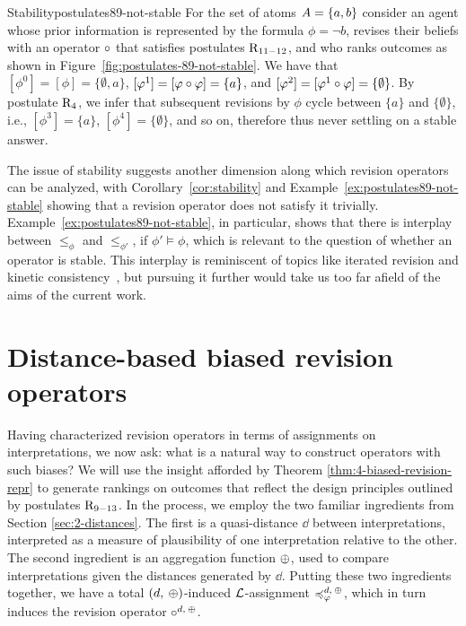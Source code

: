 \begin{xmpl}{Stability}{postulates89-not-stable}
	For the set of atoms $A=\{a,b\}$
	consider an agent whose prior information is represented by the formula
	$\phi=\lnot b$,
	revises their beliefs with an operator $\circ$ that satisfies postulates $\mathrm{R}_{11-12}$,
	and who ranks outcomes as shown in Figure~\ref{fig:postulates-89-not-stable}.
	We have that $[\phi^0]=[\phi]=\{\emptyset,a\}$,
	$[\varphi^1]=[\varphi\circ\varphi]=\{a\}$,
	and $[\varphi^2]=[\varphi^1\circ\varphi]=\{\emptyset\}$.
	By postulate $\mathrm{R}_{4}$, we infer that subsequent revisions by $\phi$
	cycle between $\{a\}$ and $\{\emptyset\}$,
	i.e., 
	$[\phi^3]=\{a\}$,
	$[\phi^4]=\{\emptyset\}$,
	and so on, 
	therefore 
	thus never settling on a stable answer.
\end{xmpl}

The issue of stability suggests another dimension along which
revision operators can be analyzed, with Corollary~\ref{cor:stability}
and Example~\ref{ex:postulates89-not-stable} showing that a revision operator does not 
satisfy it trivially. 
Example~\ref{ex:postulates89-not-stable}, in particular, shows that there is 
interplay between $\le_\phi$ and $\le_{\phi'}$, if $\phi'\models\phi$,
which is relevant to the question of whether an operator is stable.
This interplay is reminiscent of topics like iterated 
revision and kinetic consistency~\cite{DarwicheP97,PeppasW16},
but pursuing it further would take us too far afield of the aims of the current work.



\section{Distance-based biased revision operators}\label{sec:4-dist-based-biased operators}
Having characterized revision operators in terms of 
assignments on interpretations, we now ask: 
what is a natural way to construct operators with such biases?
We will use the insight afforded by Theorem \ref{thm:4-biased-revision-repr}
to generate rankings on outcomes
that reflect the design principles outlined by postulates $\mathrm{R}_{9-13}$.
In the process, we employ the two familiar ingredients from Section \ref{sec:2-distances}.
The first is a quasi-distance $\dd$ between interpretations,
interpreted as a measure of plausibility 
of one interpretation relative to the other.
The second ingredient is an aggregation function ${\operatorname{\oplus}}$,
used to compare interpretations given the distances generated by $\dd$.
Putting these two ingredients together,
we have a total $(d,\:{\operatorname{\oplus}})$-induced $\mathcal{L}$-assignment $\preccurlyeq^{d,\:{\operatorname{\oplus}}}_\varphi$,
which in turn induces the revision operator $\circ^{d,\:{\operatorname{\oplus}}}$.

